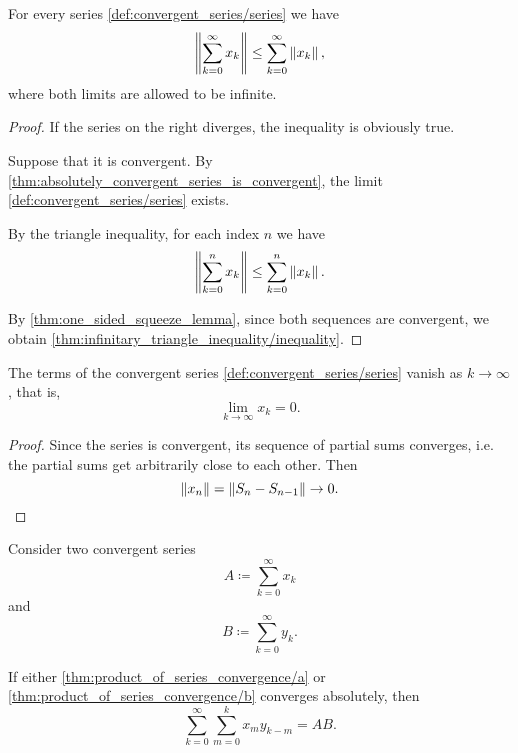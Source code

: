 \begin{proposition}\label{thm:infinitary_triangle_inequality}
  For every series \cref{def:convergent_series/series} we have
  \begin{equation}\label{thm:infinitary_triangle_inequality/inequality}
    \left\Vert \sum_{k=0}^\infty x_k \right\Vert \leq \sum_{k=0}^\infty \left\Vert x_k \right\Vert,
  \end{equation}
  where both limits are allowed to be infinite.
\end{proposition}
\begin{proof}
  If the series on the right diverges, the inequality is obviously true.

  Suppose that it is convergent. By \cref{thm:absolutely_convergent_series_is_convergent}, the limit
  \cref{def:convergent_series/series} exists.

  By the triangle inequality, for each index \( n \) we have
  \begin{equation*}
    \left\Vert \sum_{k=0}^n x_k \right\Vert \leq \sum_{k=0}^n \left\Vert x_k \right\Vert.
  \end{equation*}

  By \cref{thm:one_sided_squeeze_lemma}, since both sequences are convergent, we obtain \cref{thm:infinitary_triangle_inequality/inequality}.
\end{proof}

\begin{proposition}\label{thm:convergent_series_terms_vanish}
  The terms of the convergent series \cref{def:convergent_series/series} vanish as \( k \to \infty \), that is,
  \begin{equation*}
    \lim_{k \to \infty} x_k = 0.
  \end{equation*}
\end{proposition}
\begin{proof}
  Since the series is convergent, its sequence of partial sums converges, i.e. the partial sums get arbitrarily close to each other. Then
  \begin{equation*}
    \left\Vert x_n \right\Vert = \left\Vert S_n - S_{n-1} \right\Vert \to 0.
  \end{equation*}
\end{proof}

\begin{theorem}\label{thm:product_of_series_convergence}
  Consider two convergent series
  \begin{equation}\label{thm:product_of_series_convergence/a}
    A \coloneqq \sum_{k=0}^\infty x_k
  \end{equation}
  and
  \begin{equation}\label{thm:product_of_series_convergence/b}
    B \coloneqq \sum_{k=0}^\infty y_k.
  \end{equation}

  If either \cref{thm:product_of_series_convergence/a} or \cref{thm:product_of_series_convergence/b} converges absolutely, then
  \begin{equation}\label{thm:product_of_series_convergence/prod}
    \sum_{k=0}^\infty \sum_{m=0}^k x_m y_{k-m} = AB.
  \end{equation}
\end{theorem}

